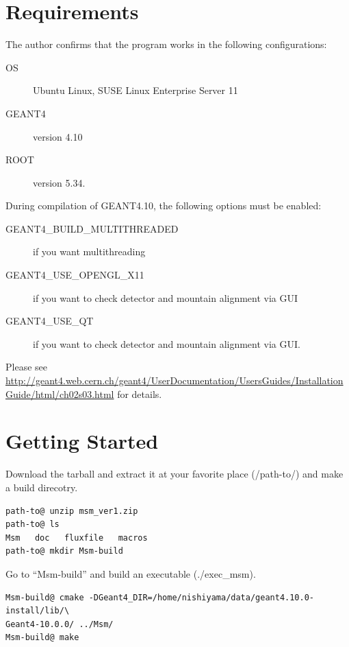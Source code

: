 \documentclass[11pt,a4paper]{jsarticle}
\begin{document}
\section{Requirements}

The author confirms that the program works in the following configurations:
\begin{description}
\item [OS] Ubuntu Linux, SUSE Linux Enterprise Server 11
\item [GEANT4] version 4.10
\item [ROOT] version 5.34.
\end{description}

During compilation of GEANT4.10, the following options must be enabled:
\begin{description}
\item [GEANT4\_BUILD\_MULTITHREADED] if you want multithreading
\item [GEANT4\_USE\_OPENGL\_X11] if you want to check detector and mountain alignment via GUI
\item [GEANT4\_USE\_QT] if you want to check detector and mountain alignment via GUI.
\end{description}
Please see \url{http://geant4.web.cern.ch/geant4/UserDocumentation/UsersGuides/InstallationGuide/html/ch02s03.html}
for details.





\section{Getting Started}

Download the tarball and extract it at your favorite place (/path-to/)
and make a build direcotry.

\begin{screen}
{\small
\begin{verbatim}
path-to@ unzip msm_ver1.zip
path-to@ ls
Msm   doc   fluxfile   macros
path-to@ mkdir Msm-build 
\end{verbatim}}
\end{screen}

Go to ``Msm-build'' and build an executable (./exec\_msm).

\begin{screen}
{\small
\begin{verbatim}
Msm-build@ cmake -DGeant4_DIR=/home/nishiyama/data/geant4.10.0-install/lib/\
Geant4-10.0.0/ ../Msm/
Msm-build@ make
\end{verbatim}}
\end{screen}
\end{document}
